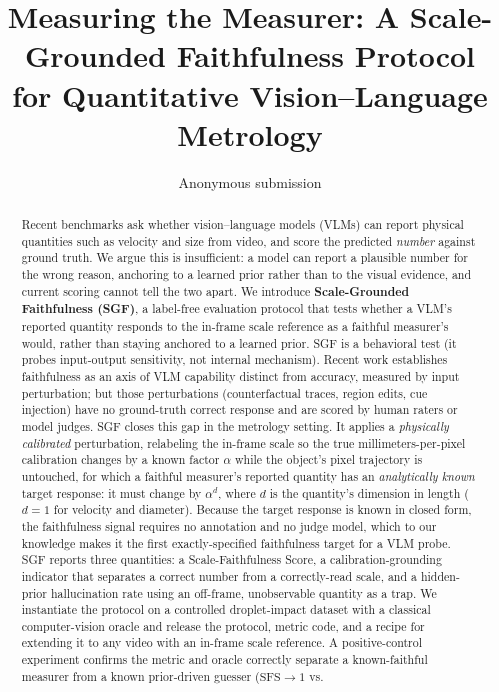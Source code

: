 \documentclass[11pt]{article}
\title{Measuring the Measurer: A Scale-Grounded Faithfulness Protocol\\
for Quantitative Vision--Language Metrology}
\author{Anonymous submission}
\date{}
\newcommand{\sfs}{\mathrm{SFS}}
\begin{document}
\maketitle

\begin{abstract}
Recent benchmarks ask whether vision--language models (VLMs) can report physical
quantities such as velocity and size from video, and score the predicted
\emph{number} against ground truth. We argue this is insufficient: a model can
report a plausible number for the wrong reason, anchoring to a learned prior
rather than to the visual evidence, and current scoring cannot tell the two
apart. We introduce \textbf{Scale-Grounded Faithfulness (SGF)}, a label-free
evaluation protocol that tests whether a VLM's reported quantity responds to the
in-frame scale reference as a faithful measurer's would, rather than staying
anchored to a learned prior. SGF is a behavioral test (it probes input-output
sensitivity, not internal mechanism). Recent work establishes faithfulness as an
axis of VLM capability distinct from accuracy, measured by input perturbation;
but those perturbations (counterfactual traces, region edits, cue injection) have
no ground-truth correct response and are scored by human raters or model judges.
SGF closes this gap in the metrology setting. It applies a
\emph{physically calibrated} perturbation, relabeling the in-frame scale so the
true millimeters-per-pixel calibration changes by a known factor $\alpha$ while
the object's pixel trajectory is untouched, for which a faithful measurer's
reported quantity has an \emph{analytically known} target response: it must change
by $\alpha^{d}$, where $d$ is the quantity's dimension in length ($d{=}1$ for
velocity and diameter). Because the target response is known in closed form, the
faithfulness signal requires no annotation and no judge model, which to our
knowledge makes it the first exactly-specified faithfulness target for a VLM
probe.
SGF reports three quantities: a Scale-Faithfulness Score, a calibration-grounding
indicator that separates a correct number from a correctly-read scale, and a
hidden-prior hallucination rate using an off-frame, unobservable quantity as a
trap. We instantiate the protocol on a controlled droplet-impact dataset with a
classical computer-vision oracle and release the protocol, metric code, and a
recipe for extending it to any video with an in-frame scale reference. A
positive-control experiment confirms the metric and oracle correctly separate a
known-faithful measurer from a known prior-driven guesser ($\sfs\to1$ vs.\

\end{abstract}
\end{document}
